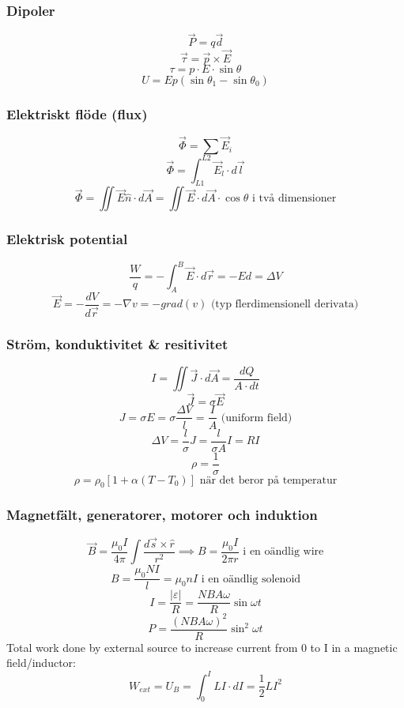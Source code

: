 \documentclass{article}
\begin{document}
\subsubsection{Dipoler}
\[ \vec{P} = q \vec{d} \]
\[ \vec{\tau} = \vec{p} \times \vec{E} \]
\[ \tau = p \cdot E \cdot \sin{\theta} \]
\[ U = Ep(\sin \theta_1 - \sin \theta_0) \]

\subsubsection{Elektriskt flöde (flux)}
\[ \vec{\Phi} = \sum \vec{E}_i \]
\[ \vec{\Phi} = \int_{L1}^{L2} \vec{E}_l \cdot d\vec{l} \]
\[ \vec{\Phi} = \iint \vec{E}\hat{n} \cdot d\vec{A} = \iint \vec{E} \cdot d\vec{A} \cdot \cos{\theta} \textrm{ i två dimensioner}\]

\subsubsection{Elektrisk potential}
\[ \frac{W}{q} = -\int_A^B \vec{E} \cdot d\vec{r} = -Ed = \Delta V \]
\[ \vec{E} = -\frac{dV}{d\vec{r}} = -\nabla v  = -grad(v) \textrm{ (typ flerdimensionell derivata)} \]

\subsubsection{Ström, konduktivitet \& resitivitet}
\[ I = \iint \vec{J} \cdot d\vec{A} = \frac{dQ}{A \cdot dt} \]
\[ \vec{J} = \sigma \vec{E} \]
\[ J = \sigma E = \sigma \frac{\Delta V}{l} = \frac{I}{A} \textrm{ (uniform field)} \]
\[ \Delta V = \frac{l}{\sigma}J = \frac{l}{\sigma A} I = RI \]
\[ \rho = \frac{1}{\sigma} \]
\[ \rho = \rho_0 [1 + \alpha (T - T_0)] \textrm{ när det beror på temperatur} \]

\subsubsection{Magnetfält, generatorer, motorer och induktion}
\[ \vec{B} = \frac{\mu_0 I}{4\pi} \int \frac{d \vec{s} \times \hat{r}}{r^2} \implies B = \frac{\mu_0 I}{2\pi r} \textrm{ i en oändlig wire} \]
\[ B = \frac{\mu_0 NI}{l} = \mu_0 nI \textrm{ i en oändlig solenoid} \]
\[ I = \frac{|\varepsilon|}{R} = \frac{NBA\omega}{R} \sin \omega t \]
\[ P = \frac{(NBA\omega)^2}{R} \sin^2 \omega t\]
Total work done by external source to increase current from 0 to I in a magnetic field/inductor: \[ W_{ext} = U_B = \int_0^I LI \cdot dI  = \frac{1}{2}LI^2 \]
\end{document}

